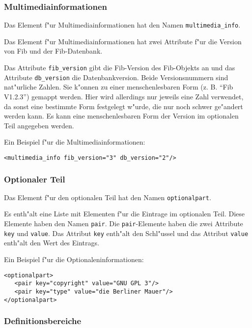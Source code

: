 \subsubsection{Multimediainformationen}
\label{secXmlMultimediainfo}


Das Element f"ur Multimediainformationen hat den Namen \verb|multimedia_info|.

Das Element f"ur Multimediainformationen hat zwei Attribute f"ur die Version von Fib und der Fib-Datenbank.

Das Attribute \verb|fib_version| gibt die Fib-Version des Fib-Objekts an und das Attribute \verb|db_version| die Datenbankversion. Beide Versionsnummern sind nat"urliche Zahlen. Sie k"onnen zu einer menschenlesbaren Form (z. B. ``Fib V1.2.3'') gemappt werden. Hier wird allerdings nur jeweils eine Zahl verwendet, da sonst eine bestimmte Form festgelegt w"urde, die nur noch schwer ge"andert werden kann. Es kann eine menschenlesbaren Form der Version im optionalen Teil angegeben werden.

\bigskip\noindent
Ein Beispiel f"ur die Multimediainformationen:
\begin{verbatim}
<multimedia_info fib_version="3" db_version="2"/>
\end{verbatim}


\subsubsection{Optionaler Teil}
\label{secXmlRootOptionalPart}

Das Element f"ur den optionalen Teil hat den Namen \verb|optionalpart|.

Es enth"alt eine Liste mit Elementen f"ur die Eintrage im optionalen Teil. Diese Elemente haben den Namen \verb|pair|. Die \verb|pair|-Elemente haben die zwei Attribute \verb|key| und \verb|value|.
Das Attribut \verb|key| enth"alt den Schl"ussel und das Attribut \verb|value| enth"alt den Wert des Eintrags.

\bigskip\noindent
Ein Beispiel f"ur die Optionaleninformationen:
\begin{verbatim}
<optionalpart>
   <pair key="copyright" value="GNU GPL 3"/>
   <pair key="type" value="die Berliner Mauer"/>
</optionalpart>
\end{verbatim}


\subsubsection{Definitionsbereiche}
\label{secXmlDefinitionranges}

